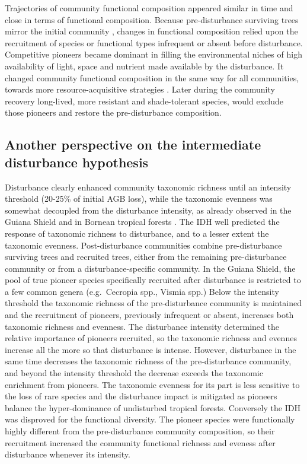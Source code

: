 \documentclass[fleqn,10pt]{ArtEcoFoG} %
\begin{document}
Trajectories of community functional composition appeared similar in
time and close in terms of functional composition. Because
pre-disturbance surviving trees mirror the initial community
\citep{Herault2018}, changes in functional composition relied upon the
recruitment of species or functional types infrequent or absent before
disturbance. Competitive pioneers became dominant in filling the
environmental niches of high availability of light, space and nutrient
made available by the disturbance. It changed community functional
composition in the same way for all communities, towards more
resource-acquisitive strategies
\citep{Grime1998, Westoby1998, Wright2004, Reich2014}. Later during the
community recovery long-lived, more resistant and shade-tolerant
species, would exclude those pioneers and restore the pre-disturbance
composition.

\subsection{Another perspective on the intermediate disturbance
hypothesis}\label{another-perspective-on-the-intermediate-disturbance-hypothesis}

Disturbance clearly enhanced community taxonomic richness until an
intensity threshold (20-25\% of initial AGB loss), while the taxonomic
evenness was somewhat decoupled from the disturbance intensity, as
already observed in the Guiana Shield \citep{Baraloto2012a} and in
Bornean tropical forests \citep{Cannon1998}. The IDH well predicted the
response of taxonomic richness to disturbance, and to a lesser extent
the taxonomic evenness. Post-disturbance communities combine
pre-disturbance surviving trees and recruited trees, either from the
remaining pre-disturbance community or from a disturbance-specific
community. In the Guiana Shield, the pool of true pioneer species
specifically recruited after disturbance is restricted to a few common
genera (e.g.~Cecropia spp., Vismia spp.) Below the intensity threshold
the taxonomic richness of the pre-disturbance community is maintained
and the recruitment of pioneers, previously infrequent or absent,
increases both taxonomic richness and evenness. The disturbance
intensity determined the relative importance of pioneers recruited, so
the taxonomic richness and evennes increase all the more so that
disturbance is intense. However, disturbance in the same time decreases
the taxonomic richness of the pre-disturbance community, and beyond the
intensity threshold the decrease exceeds the taxonomic enrichment from
pioneers. The taxonomic evenness for its part is less sensitive to the
loss of rare species and the disturbance impact is mitigated as pioneers
balance the hyper-dominance of undisturbed tropical forests. Conversely
the IDH was disproved for the functional diversity. The pioneer species
were functionally highly different from the pre-disturbance community
composition, so their recruitment increased the community functional
richness and eveness after disturbance whenever its intensity.
\end{document}

